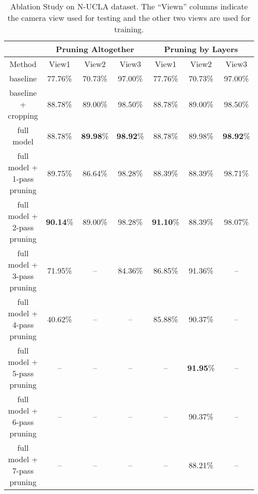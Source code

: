 \documentclass{article}
\begin{document}
\begin{table*}
\begin{center}
\caption{Ablation Study on N-UCLA dataset. The ``Viewn'' columns indicate the camera view used for testing and the other two views are used for training.}
\label{tbl:NUCLA_ab}
\begin{tabular}{|c|c|c|c|c|c|c|}
\hline
& \multicolumn{3}{c|}{Pruning Altogether} & \multicolumn{3}{c|}{Pruning by Layers}\\
\hline
Method & View1 & View2 & View3 & View1 & View2 & View3 \\
\hline

baseline & 77.76\% & 70.73\% & 97.00\% & 77.76\% & 70.73\% & 97.00\%  \\
baseline + cropping & 88.78\% & 89.00\% & 98.50\% & 88.78\% & 89.00\% & 98.50\% \\
full model & 88.78\% & \textbf{89.98}\% & \textbf{98.92}\% & 88.78\% & 89.98\% & \textbf{98.92}\% \\
full model + 1-pass pruning & 89.75\% & 86.64\% & 98.28\% & 88.39\% & 88.39\% & 98.71\%\\
full model + 2-pass pruning & \textbf{90.14}\% & 89.00\% & 98.28\% & \textbf{91.10}\% & 88.39\% & 98.07\%\\
full model + 3-pass pruning & 71.95\% & -- & 84.36\% & 86.85\% & 91.36\% & --\\
full model + 4-pass pruning & 40.62\% & -- & -- & 85.88\% & 90.37\% & -- \\
full model + 5-pass pruning & -- & -- & -- & -- & \textbf{91.95}\% & -- \\
full model + 6-pass pruning & -- & -- & -- & -- & 90.37\% & -- \\
full model + 7-pass pruning & -- & -- & -- & -- & 88.21\% & -- \\

\hline
\end{tabular}
\end{center}
\end{table*}
\end{document}

